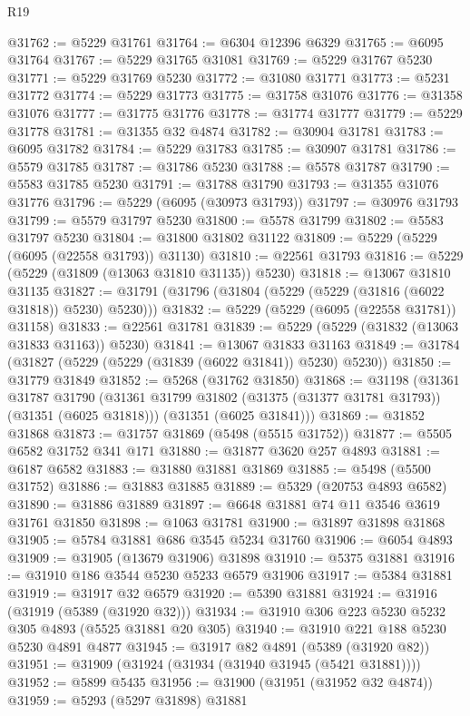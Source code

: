 \begin{lexlean}{R19}
\begin{coremodule}
@31762 := @5229 @31761
@31764 := @6304 @12396 @6329
@31765 := @6095 @31764
@31767 := @5229 @31765 @31081
@31769 := @5229 @31767 @5230
@31771 := @5229 @31769 @5230
@31772 := @31080 @31771
@31773 := @5231 @31772
@31774 := @5229 @31773
@31775 := @31758 @31076
@31776 := @31358 @31076
@31777 := @31775 @31776
@31778 := @31774 @31777
@31779 := @5229 @31778
@31781 := @31355 @32 @4874
@31782 := @30904 @31781
@31783 := @6095 @31782
@31784 := @5229 @31783
@31785 := @30907 @31781
@31786 := @5579 @31785
@31787 := @31786 @5230
@31788 := @5578 @31787
@31790 := @5583 @31785 @5230
@31791 := @31788 @31790
@31793 := @31355 @31076 @31776
@31796 := @5229 (@6095 (@30973 @31793))
@31797 := @30976 @31793
@31799 := @5579 @31797 @5230
@31800 := @5578 @31799
@31802 := @5583 @31797 @5230
@31804 := @31800 @31802 @31122
@31809 := @5229 (@5229 (@6095 (@22558 @31793)) @31130)
@31810 := @22561 @31793
@31816 := @5229 (@5229 (@31809 (@13063 @31810 @31135)) @5230)
@31818 := @13067 @31810 @31135
@31827 := @31791 (@31796 (@31804 (@5229 (@5229 (@31816 (@6022 @31818)) @5230) @5230)))
@31832 := @5229 (@5229 (@6095 (@22558 @31781)) @31158)
@31833 := @22561 @31781
@31839 := @5229 (@5229 (@31832 (@13063 @31833 @31163)) @5230)
@31841 := @13067 @31833 @31163
@31849 := @31784 (@31827 (@5229 (@5229 (@31839 (@6022 @31841)) @5230) @5230))
@31850 := @31779 @31849
@31852 := @5268 (@31762 @31850)
@31868 := @31198
    (@31361
      @31787
      @31790
      (@31361 @31799 @31802 (@31375 (@31377 @31781 @31793)) (@31351 (@6025 @31818)))
      (@31351 (@6025 @31841)))
@31869 := @31852 @31868
@31873 := @31757 @31869 (@5498 (@5515 @31752))
@31877 := @5505 @6582 @31752 @341 @171
@31880 := @31877 @3620 @257 @4893
@31881 := @6187 @6582
@31883 := @31880 @31881 @31869
@31885 := @5498 (@5500 @31752)
@31886 := @31883 @31885
@31889 := @5329 (@20753 @4893 @6582)
@31890 := @31886 @31889
@31897 := @6648 @31881 @74 @11 @3546 @3619 @31761 @31850
@31898 := @1063 @31781
@31900 := @31897 @31898 @31868
@31905 := @5784 @31881 @686 @3545 @5234 @31760
@31906 := @6054 @4893
@31909 := @31905 (@13679 @31906) @31898
@31910 := @5375 @31881
@31916 := @31910 @186 @3544 @5230 @5233 @6579 @31906
@31917 := @5384 @31881
@31919 := @31917 @32 @6579
@31920 := @5390 @31881
@31924 := @31916 (@31919 (@5389 (@31920 @32)))
@31934 := @31910 @306 @223 @5230 @5232 @305 @4893 (@5525 @31881 @20 @305)
@31940 := @31910 @221 @188 @5230 @5230 @4891 @4877
@31945 := @31917 @82 @4891 (@5389 (@31920 @82))
@31951 := @31909 (@31924 (@31934 (@31940 @31945 (@5421 @31881))))
@31952 := @5899 @5435
@31956 := @31900 (@31951 (@31952 @32 @4874))
@31959 := @5293 (@5297 @31898) @31881

\end{coremodule}
\end{lexlean}
